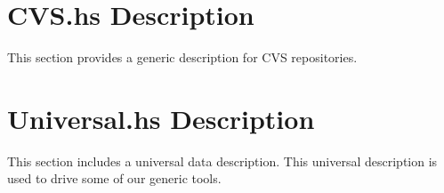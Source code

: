 \documentclass[nocopyrightspace,natbib,onecolumn,9pt]{sigplanconf}
\begin{document}


\newpage

\section{CVS.hs Description}

This section provides a generic description for CVS repositories.



\section{Universal.hs Description}

This section includes a universal data description.  This universal description
is used to drive some of our generic tools.


\end{document}
